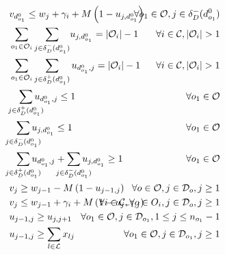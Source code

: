 \documentclass{article}
\begin{document}
\begin{alignat}{3}
  \label{mod:c10} &  v_{d^0_{o_1}}  \leq  w_j + \gamma_i + M\left(1- u_{j,d^0_{o_1}}\right) &  \hspace{-20mm}  \forall  o_1 \in \mathcal{O},  j \in \delta_{D}^{-}(d^0_{o_1}) \\
    \label{mod:c11} &  \sum_{ \substack{o_1 \in \mathcal{O}_i }}{ \sum_{ j \in \delta^{-}_{D}(d^0_{o_1})}}{u_{j,d^0_{o_1} } } = |\mathcal{O}_i|-1 & \hspace{-20mm} \forall  i \in \mathcal{C},|\mathcal{O}_i| > 1 \\
    \label{mod:c12}&   \sum_{ \substack{o_1 \in \mathcal{O}_i }}\sum_{ j \in \delta^{+}_{D}(d^0_{o_1})}{u_{d^0_{o_1},j } } = |\mathcal{O}_i|-1 & \hspace{-40mm} \forall  i \in \mathcal{C}, |\mathcal{O}_i| > 1 \\
    \label{mod:c13} & \hspace{3mm} \smashoperator{ \sum_{ j \in \delta^{+}_{D}(d^0_{o_1})}}{u_{d^0_{o_1},j } } \leq 1 & \hspace{-20mm}  \forall o_1 \in \mathcal{O} \\
    \label{mod:c14} & \hspace{2mm} \smashoperator{ \sum_{ j \in \delta^{-}_{D}(d^0_{o_1})}}{u_{j,d^0_{o_1} } } \leq 1 & \hspace{-20mm} \forall o_1 \in \mathcal{O} \\
    \label{mod:c15} & \hspace{2mm} \smashoperator{ \sum_{ j \in \delta^{+}_{D}(d^0_{o_1})}}{u_{d^0_{o_1},j } } +\smashoperator{ \sum_{ j \in \delta^{-}_{D}(d^0_{o_1})}}{u_{j,d^0_{o_1} } } \geq 1         & \hspace{-20mm} \forall o_1 \in \mathcal{O} \\
    \label{mod:c16} & v_{j} \geq w_{j-1} - M\left(1- u_{j-1,j}\right) & \hspace{-20mm}  \forall o \in \mathcal{O}, j \in \mathcal{D}_{o}, j \geq 1 \\
  \label{mod:c17} &  v_{j}  \leq  w_{j-1} + \gamma_i + M\left(1- u_{j-1,j}\right) & \hspace{-20mm} \forall i \in \mathcal{C}, \forall o \in O_i, j \in \mathcal{D}_{o}, j \geq 1 \\
   \label{mod:c18}   &   u_{j-1,j} \geq u_{j,j+1} & \hspace{-35mm} \forall o_1 \in\mathcal{O},  j \in \mathcal{D}_{o_1}, 1 \leq j \leq n_{o_{1}}-1\\
  \label{mod:c19} &  u_{j-1,j} \geq \sum_{l \in \mathcal{L}}{x_{lj}} &\hspace{-20mm}  \forall o_1 \in \mathcal{O}, j \in \mathcal{D}_{o_1}, j \geq 1 \\

\end{alignat}
\end{document}

